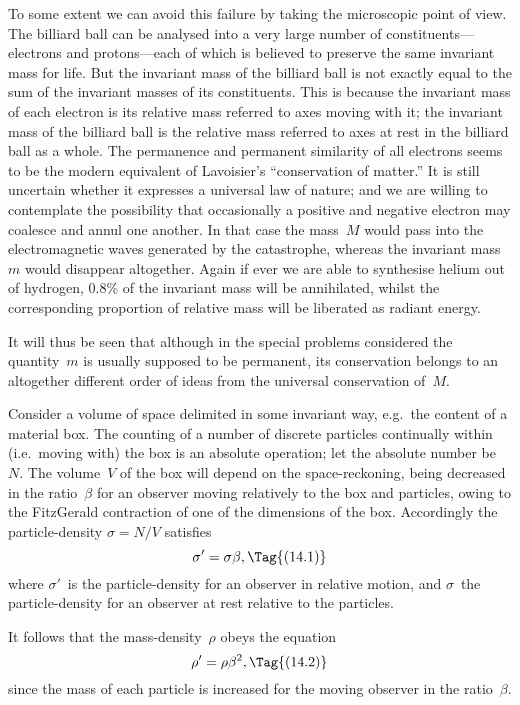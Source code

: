 \documentclass[12pt]{book}
\begin{document}
To some extent we can avoid this failure by taking the microscopic point
of view. The billiard ball can be analysed into a very large number of constituents---electrons
and protons---each of which is believed to preserve the
same invariant mass for life. But the invariant mass of the billiard ball is
not exactly equal to the sum of the invariant masses of its constituents\footnotemark.\footnotetext
  {This is because the invariant mass of each electron is its relative mass referred to axes
  moving with it; the invariant mass of the billiard ball is the relative mass referred to axes at rest
  in the billiard ball as a whole.}
The permanence and permanent similarity of all electrons seems to be the
modern equivalent of Lavoisier's ``conservation of matter.'' It is still uncertain
whether it expresses a universal law of nature; and we are willing to contemplate
the possibility that occasionally a positive and negative electron
may coalesce and annul one another. In that case the mass~$M$ would pass
into the electromagnetic waves generated by the catastrophe, whereas the
invariant mass~$m$ would disappear altogether. Again if ever we are able to
synthesise helium out of hydrogen, 0.8\% of the invariant mass will
be annihilated, whilst the corresponding proportion of relative mass will be
liberated as radiant energy.

It will thus be seen that although in the special problems considered the
quantity~$m$ is usually supposed to be permanent, its conservation belongs to
an altogether different order of ideas from the universal conservation of~$M$.

%

Consider a volume of space delimited in some invariant way, e.g.\ the
content of a material box. The counting of a number of discrete particles
continually within (i.e.\ moving with) the box is an absolute operation; let
the absolute number be~$N$. The volume~$V$ of the box will depend on the
space-reckoning, being decreased in the ratio~$\beta$ for an observer moving
relatively to the box and particles, owing to the FitzGerald contraction of one
of the dimensions of the box. Accordingly the particle-density $\sigma = N/V$
satisfies
\[
\sigma' = \sigma\beta,
\Tag{(14.1)}
\]
where $\sigma'$~is the particle-density for an observer in relative motion, and $\sigma$~the
particle-density for an observer at rest relative to the particles.

It follows that the mass-density~$\rho$ obeys the equation
\[
\rho' = \rho\beta^{2},
\Tag{(14.2)}
\]
since the mass of each particle is increased for the moving observer in the
ratio~$\beta$.
\end{document}
